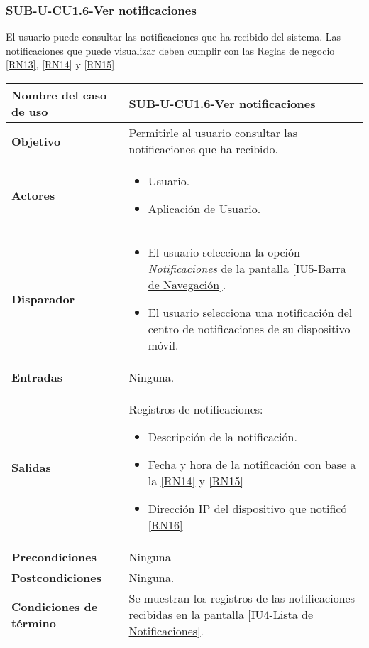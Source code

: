 
\subsubsection{SUB-U-CU1.6-Ver notificaciones}\label{SUB-U-CU1.6}
El usuario puede consultar las notificaciones que ha recibido del sistema. Las notificaciones que puede visualizar deben cumplir con las Reglas de negocio \ref{RN13}, \ref{RN14} y \ref{RN15}

\begin{longtable}{|J{5cm}|J{10.3cm}|}
	\hline
	\textbf{Nombre del caso de uso} &
		SUB-U-CU1.6-Ver notificaciones \\ \hline
	\textbf{Objetivo} &
		Permitirle al usuario consultar las notificaciones que ha recibido. \\ \hline
	\textbf{Actores} &
	    \begin{itemize}
		    \item Usuario. 
		    \item Aplicación de Usuario.
		\end{itemize}
		    \\ \hline 
	\textbf{Disparador} & 
		\begin{itemize}
		    \item El usuario selecciona la opción \textit{Notificaciones} de la pantalla \hyperref[fig:Barra de navegacion]{[IU5-Barra de Navegación]}.
		    \item El usuario selecciona una notificación del centro de notificaciones de su dispositivo móvil.
		 \end{itemize}
		 \\ \hline 
	\textbf{Entradas} & Ninguna.
		\\ \hline 
	\textbf{Salidas} & 
	    Registros de notificaciones:
		\begin{itemize}
			\item Descripción de la notificación.
			\item Fecha y hora de la notificación con base a la \ref{RN14} y \ref{RN15}
			\item Dirección IP del dispositivo que notificó \ref{RN16}
		\end{itemize} 
		\\ \hline
	\textbf{Precondiciones} &
	    Ninguna
		\\ \hline
	\textbf{Postcondiciones} & Ninguna.
		\\ \hline
	\textbf{Condiciones de término} & Se muestran los registros de las notificaciones recibidas en la pantalla \hyperref[fig:Lista de Notificaciones]{[IU4-Lista de Notificaciones]}.

\end{longtable}
